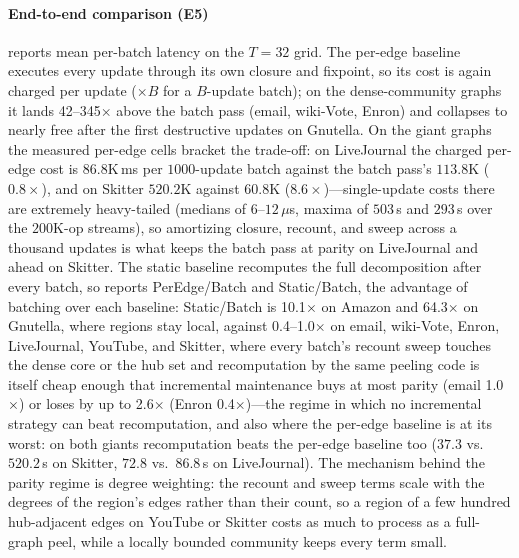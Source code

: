 \paragraph{End-to-end comparison (E5)}
\label{par:endtoend}
 reports mean per-batch latency on the $T{=}32$ grid.
The per-edge baseline executes every update through its own closure and fixpoint, so its cost is again charged per update ($\times B$ for a $B$-update batch); on the dense-community graphs it lands 42--345$\times$ above the batch pass (email, wiki-Vote, Enron) and collapses to nearly free after the first destructive updates on Gnutella.
On the giant graphs the measured per-edge cells bracket the trade-off: on LiveJournal the charged per-edge cost is $86.8$K\,ms per $1000$-update batch against the batch pass's $113.8$K ($0.8\times$), and on Skitter $520.2$K against $60.8$K ($8.6\times$)---single-update costs there are extremely heavy-tailed (medians of $6$--$12\,\mu$s, maxima of $503$\,s and $293$\,s over the $200$K-op streams), so amortizing closure, recount, and sweep across a thousand updates is what keeps the batch pass at parity on LiveJournal and ahead on Skitter.
The static baseline recomputes the full decomposition after every batch, so  reports PerEdge/Batch and Static/Batch, the advantage of batching over each baseline: Static/Batch is 10.1$\times$ on Amazon and 64.3$\times$ on Gnutella, where regions stay local, against 0.4--1.0$\times$ on email, wiki-Vote, Enron, LiveJournal, YouTube, and Skitter, where every batch's recount sweep touches the dense core or the hub set and recomputation by the same peeling code is itself cheap enough that incremental maintenance buys at most parity (email 1.0$\times$) or loses by up to 2.6$\times$ (Enron 0.4$\times$)---the regime in which no incremental strategy can beat recomputation, and also where the per-edge baseline is at its worst: on both giants recomputation beats the per-edge baseline too ($37.3$ vs.\ $520.2$\,s on Skitter, $72.8$ vs.\ $86.8$\,s on LiveJournal).
The mechanism behind the parity regime is degree weighting: the recount and sweep terms scale with the degrees of the region's edges rather than their count, so a region of a few hundred hub-adjacent edges on YouTube or Skitter costs as much to process as a full-graph peel, while a locally bounded community keeps every term small.

\begin{table}[tb]
\caption{End-to-end comparison at $T{=}32$ (ms/batch; per-edge is charged $\times B$ from its $B$-invariant per-op cost---$50$K-op $B{=}1$ streams on the six smaller graphs, $200$K-op $B{=}1$ streams on LiveJournal and Skitter; means of five runs, three on YouTube, LiveJournal, and Skitter; dashes mark baselines not run, and Static/Batch below $1$ means recomputation is the cheaper choice).}
\label{tab:endtoend}

\end{table}

